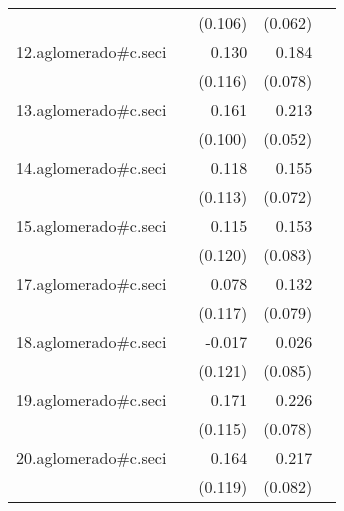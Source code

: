 {\begin{longtable}{l*{4}{D{.}{.}{-1}}}
            &                     &     (0.106)         &     (0.062)         &                     \\
\addlinespace
12.aglomerado#c.seci&                     &       0.130         &       0.184\sym{*}  &                     \\
            &                     &     (0.116)         &     (0.078)         &                     \\
\addlinespace
13.aglomerado#c.seci&                     &       0.161         &       0.213\sym{***}&                     \\
            &                     &     (0.100)         &     (0.052)         &                     \\
\addlinespace
14.aglomerado#c.seci&                     &       0.118         &       0.155\sym{*}  &                     \\
            &                     &     (0.113)         &     (0.072)         &                     \\
\addlinespace
15.aglomerado#c.seci&                     &       0.115         &       0.153         &                     \\
            &                     &     (0.120)         &     (0.083)         &                     \\
\addlinespace
17.aglomerado#c.seci&                     &       0.078         &       0.132         &                     \\
            &                     &     (0.117)         &     (0.079)         &                     \\
\addlinespace
18.aglomerado#c.seci&                     &      -0.017         &       0.026         &                     \\
            &                     &     (0.121)         &     (0.085)         &                     \\
\addlinespace
19.aglomerado#c.seci&                     &       0.171         &       0.226\sym{**} &                     \\
            &                     &     (0.115)         &     (0.078)         &                     \\
\addlinespace
20.aglomerado#c.seci&                     &       0.164         &       0.217\sym{**} &                     \\
            &                     &     (0.119)         &     (0.082)         &                     \\

\end{longtable}}
